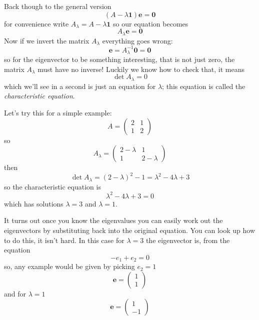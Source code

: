 \documentclass[12pt]{article}
\begin{document}
Back though to the general version
\begin{equation}
  \left(A-\lambda \textbf{1}\right)\mathbf{e}=\mathbf{0}
\end{equation}
for convenience write $A_\lambda=A-\lambda \textbf{1}$ so our equation becomes
\begin{equation}
  A_\lambda \textbf{e}=\textbf{0}
\end{equation}
Now if we invert the matrix $A_\lambda$ everything goes wrong:
\begin{equation}
  \textbf{e}=A_\lambda^{-1}\textbf{0}=\textbf{0}
\end{equation}
so for the eigenvector to be something interesting, that is not just zero, the matrix $A_\lambda$ must have no inverse! Luckily we know how to check that, it means
\begin{equation}
  \det{A_\lambda}=0
\end{equation}
which we'll see in a second is just an equation for $\lambda$; this
equation is called the \textsl{characteristic equation}.

Let's try this for a simple example:
\begin{equation}
  A=
\begin{pmatrix}
2 & 1 \\
1 & 2
\end{pmatrix}
\end{equation}
so
\begin{equation}
  A_\lambda=
\begin{pmatrix}
2-\lambda & 1 \\
1 & 2-\lambda
\end{pmatrix}
\end{equation}
then
\begin{equation}
  \det{A_\lambda}=(2-\lambda)^2-1=\lambda^2-4\lambda+3
\end{equation}
so the characteristic equation is
\begin{equation}
  \lambda^2-4\lambda+3=0
\end{equation}
which has solutions $\lambda=3$ and $\lambda=1$.

It turns out once you know the eigenvalues you can easily work out the
eigenvectors by substituting back into the original equation. You can look up how to do this, it isn't hard. In this case for $\lambda=3$ the eigenvector
is, from the equation
\begin{equation}
  -e_1+e_2=0
\end{equation}
so, any example would be given by picking $e_2=1$
\begin{equation}
  \textbf{e}=\begin{pmatrix} 1\\1\end{pmatrix}
\end{equation}
and for $\lambda=1$
\begin{equation}
  \textbf{e}=\begin{pmatrix} 1\\-1\end{pmatrix}
\end{equation}
\end{document}
